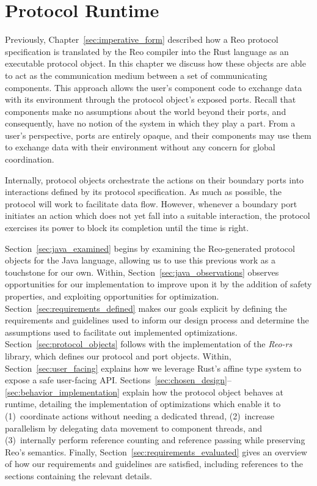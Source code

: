 \chapter{Protocol Runtime}
\label{sec:protocol_runtime}
Previously, Chapter~\ref{sec:imperative_form} described how a Reo protocol specification is translated by the Reo compiler into the Rust language as an executable protocol object. In this chapter we discuss how these objects are able to act as the communication medium between a set of communicating components. This approach allows the user's component code to exchange data with its environment through the protocol object's exposed ports. Recall that components make no assumptions about the world beyond their ports, and consequently, have no notion of the system in which they play a part. From a user's perspective, ports are entirely opaque, and their components may use them to exchange data with their environment without any concern for global coordination.

Internally, protocol objects orchestrate the actions on their boundary ports into interactions defined by its protocol specification. As much as possible, the protocol will work to facilitate data flow. However, whenever a boundary port initiates an action which does not yet fall into a suitable interaction, the protocol exercises its power to block its completion until the time is right. 

Section~\ref{sec:java_examined} begins by examining the Reo-generated protocol objects for the Java language, allowing us to use this previous work as a touchstone for our own. Within, Section~\ref{sec:java_observations} observes opportunities for our implementation to improve upon it by the addition of safety properties, and exploiting opportunities for optimization. Section~\ref{sec:requirements_defined} makes our goals explicit by defining the requirements and guidelines used to inform our design process and determine the assumptions used to facilitate out implemented optimizations.  Section~\ref{sec:protocol_objects} follows with the implementation of the \textit{Reo-rs} library, which defines our protocol and port objects. Within, Section~\ref{sec:user_facing} explains how we leverage Rust's affine type system to expose a safe user-facing API. Sections~\ref{sec:chosen_design}--\ref{sec:behavior_implementation} explain how the protocol object behaves at runtime, detailing the implementation of optimizations which enable it to (1)~coordinate actions without needing a dedicated thread, (2)~increase parallelism by delegating data movement to component threads, and (3)~internally perform reference counting and reference passing while preserving Reo's semantics. Finally, Section~\ref{sec:requirements_evaluated} gives an overview of how our requirements and guidelines are satisfied, including references to the sections containing the relevant details.

